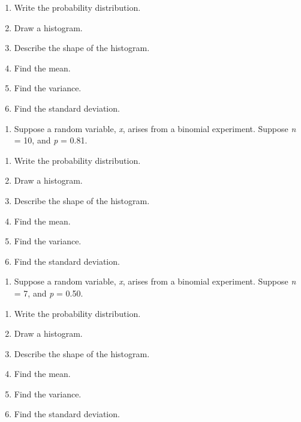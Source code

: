 \documentclass[]{book}
\providecommand{\tightlist}{%
  \setlength{\itemsep}{0pt}\setlength{\parskip}{0pt}}
\begin{document}
\begin{enumerate}
\def\labelenumi{\alph{enumi}.}
\item
  Write the probability distribution.
\item
  Draw a histogram.
\item
  Describe the shape of the histogram.
\item
  Find the mean.
\item
  Find the variance.
\item
  Find the standard deviation.
\end{enumerate}

\begin{enumerate}
\def\labelenumi{\arabic{enumi}.}
\setcounter{enumi}{1}
\tightlist
\item
  Suppose a random variable, \emph{x}, arises from a binomial experiment. Suppose \emph{n} = 10, and \emph{p} = 0.81.
\end{enumerate}

\begin{enumerate}
\def\labelenumi{\alph{enumi}.}
\item
  Write the probability distribution.
\item
  Draw a histogram.
\item
  Describe the shape of the histogram.
\item
  Find the mean.
\item
  Find the variance.
\item
  Find the standard deviation.
\end{enumerate}

\begin{enumerate}
\def\labelenumi{\arabic{enumi}.}
\setcounter{enumi}{2}
\tightlist
\item
  Suppose a random variable, \emph{x}, arises from a binomial experiment.
  Suppose \emph{n} = 7, and \emph{p} = 0.50.
\end{enumerate}

\begin{enumerate}
\def\labelenumi{\alph{enumi}.}
\item
  Write the probability distribution.
\item
  Draw a histogram.
\item
  Describe the shape of the histogram.
\item
  Find the mean.
\item
  Find the variance.
\item
  Find the standard deviation.
\end{enumerate}
\end{document}
